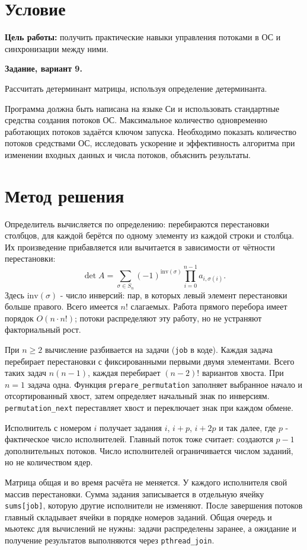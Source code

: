 \documentclass[12pt,a4paper]{article}
\begin{document}


\section{Условие}
\textbf{Цель работы:} получить практические навыки управления потоками в ОС и синхронизации между ними.

\textbf{Задание, вариант 9.}

Рассчитать детерминант матрицы, используя определение детерминанта.

Программа должна быть написана на языке Си и использовать стандартные средства создания потоков ОС. Максимальное количество одновременно работающих потоков задаётся ключом запуска. Необходимо показать количество потоков средствами ОС, исследовать ускорение и эффективность алгоритма при изменении входных данных и числа потоков, объяснить результаты.

\section{Метод решения}
Определитель вычисляется по определению: перебираются перестановки столбцов, для каждой берётся по одному элементу из каждой строки и столбца. Их произведение прибавляется или вычитается в зависимости от чётности перестановки:
\[
\det A = \sum_{\sigma \in S_n} (-1)^{\mathrm{inv}(\sigma)} \prod_{i=0}^{n-1} a_{i,\sigma(i)}.
\]
Здесь $\mathrm{inv}(\sigma)$ - число инверсий: пар, в которых левый элемент перестановки больше правого. Всего имеется $n!$ слагаемых. Работа прямого перебора имеет порядок $O(n\cdot n!)$; потоки распределяют эту работу, но не устраняют факториальный рост.

При $n\geq2$ вычисление разбивается на задачи (\texttt{job} в коде). Каждая задача перебирает перестановки с фиксированными первыми двумя элементами. Всего таких задач $n(n-1)$, каждая перебирает $(n-2)!$ вариантов хвоста. При $n=1$ задача одна. Функция \texttt{prepare\_permutation} заполняет выбранное начало и отсортированный хвост, затем определяет начальный знак по инверсиям. \texttt{permutation\_next} переставляет хвост и переключает знак при каждом обмене.

Исполнитель с номером $i$ получает задания $i$, $i+p$, $i+2p$ и так далее, где $p$ - фактическое число исполнителей. Главный поток тоже считает: создаются $p-1$ дополнительных потоков. Число исполнителей ограничивается числом заданий, но не количеством ядер.

Матрица общая и во время расчёта не меняется. У каждого исполнителя свой массив перестановки. Сумма задания записывается в отдельную ячейку \texttt{sums[job]}, которую другие исполнители не изменяют. После завершения потоков главный складывает ячейки в порядке номеров заданий. Общая очередь и мьютекс для вычислений не нужны: задачи распределены заранее, а ожидание и получение результатов выполняются через \texttt{pthread\_join}.
\end{document}

